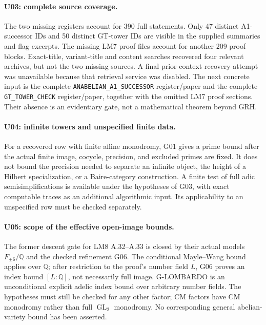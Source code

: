 \paragraph{U03: complete source coverage.}
The two missing registers account for 390 full statements. Only
47 distinct A1-successor IDs and 50 distinct GT-tower IDs are visible
in the supplied summaries and flag excerpts. The missing LM7
proof files account for another 209 proof blocks. Exact-title,
variant-title and content searches recovered four relevant archives,
but not the two missing sources. A final prior-context recovery
attempt was unavailable because that retrieval service was disabled.
The next concrete input is the complete
\texttt{ANABELIAN\_A1\_SUCCESSOR} register/paper and the complete
\texttt{GT\_TOWER\_CHECK} register/paper, together with the omitted
LM7 proof sections. Their absence is an evidentiary gate, not a
mathematical theorem beyond GRH.

\paragraph{U04: infinite towers and unspecified finite data.}
For a recovered row with finite affine monodromy, G01 gives a
prime bound after the actual finite image, cocycle, precision,
and excluded primes are fixed. It does not bound the precision
needed to separate an infinite object, the height of a Hilbert
specialization, or a Baire-category construction. A finite test of
full adic semisimplifications is available under the hypotheses of
G03, with exact computable traces as an additional algorithmic input.
Its applicability to an unspecified row must be checked separately.

\paragraph{U05: scope of the effective open-image bounds.}
The former descent gate for LM8 A.32--A.33 is closed by their actual
models $F_{\pm6}/\mathbb Q$ and the checked refinement G06.
The conditional Mayle--Wang bound applies over $\mathbb Q$; after
restriction to the proof's number field $L$, G06 proves an index
bound $[L:\mathbb Q]$, not necessarily full image.
G-LOMBARDO is an unconditional explicit adelic index bound over
arbitrary number fields. The hypotheses must still be checked for
any other factor; CM factors have CM monodromy rather than full
$\operatorname{GL}_2$ monodromy. No corresponding general abelian-variety
bound has been asserted.


